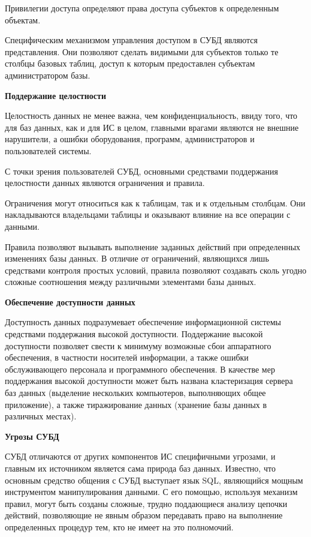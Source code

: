 Привилегии доступа определяют права доступа субъектов к определенным объектам.

Специфическим механизмом управления доступом в СУБД являются представления. Они позволяют сделать
видимыми для субъектов только те столбцы базовых таблиц, доступ к которым предоставлен субъектам администратором базы.

\bigbreak
\textbf{Поддержание целостности}

Целостность данных не менее важна, чем конфиденциальность, ввиду того, что для баз данных, как и для
ИС в целом, главными врагами являются не внешние нарушители, а ошибки оборудования, программ, администраторов и
пользователей системы.

С точки зрения пользователей СУБД, основными средствами поддержания целостности данных являются ограничения и правила.

Ограничения могут относиться как к таблицам, так и к отдельным столбцам. Они накладываются владельцами
таблицы и оказывают влияние на все операции с данными.

Правила позволяют вызывать выполнение заданных действий при определенных изменениях базы данных.
В отличие от ограничений, являющихся лишь средствами контроля простых условий, правила позволяют
создавать сколь угодно сложные соотношения между различными элементами базы данных.

\bigbreak
\textbf{Обеспечение доступности данных}

Доступность данных подразумевает обеспечение информационной системы средствами поддержания высокой
доступности. Поддержание высокой доступности позволяет свести к минимуму возможные сбои аппаратного
обеспечения, в частности носителей информации, а также ошибки обслуживающего персонала и программного
обеспечения. В качестве мер поддержания высокой доступности может быть названа кластеризация сервера баз
данных (выделение нескольких компьютеров, выполняющих общее приложение), а также тиражирование данных
(хранение базы данных в различных местах).

\bigbreak
\textbf{Угрозы СУБД}

СУБД отличаются от других компонентов ИС специфичными угрозами, и главным их источником является
сама природа баз данных. Известно, что основным средство общения с СУБД выступает язык SQL,
являющийся мощным инструментом манипулирования данными. С его помощью, используя механизм правил, могут
быть созданы сложные, трудно поддающиеся анализу цепочки действий, позволяющие не явным образом передавать
право на выполнение определенных процедур тем, кто не имеет на это полномочий.

